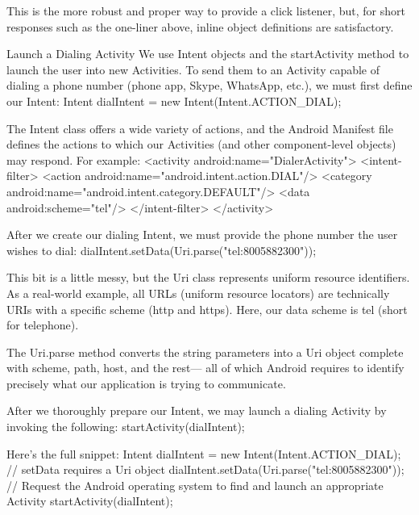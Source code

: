         This is the more robust and proper way to provide a click listener, but, for short responses such as the one-liner above, inline object definitions are satisfactory.

    Launch a Dialing Activity
        We use Intent objects and the startActivity method to launch the user into new Activities. To send them to an Activity capable of dialing a phone number (phone app, Skype, WhatsApp, etc.), we must first define our Intent:
            Intent dialIntent = new Intent(Intent.ACTION_DIAL);

        The Intent class offers a wide variety of actions, and the Android Manifest file defines the actions to which our Activities (and other component-level objects) may respond. For example:
            <activity android:name="DialerActivity">
                <intent-filter>
                    <action android:name="android.intent.action.DIAL"/>
                    <category android:name="android.intent.category.DEFAULT"/>
                    <data android:scheme="tel"/>
                </intent-filter>
            </activity>

        After we create our dialing Intent, we must provide the phone number the user wishes to dial:
            dialIntent.setData(Uri.parse("tel:8005882300"));

        This bit is a little messy, but the Uri class represents uniform resource identifiers. As a real-world example, all URLs (uniform resource locators) are technically URIs with a specific scheme (http and https). Here, our data scheme is tel (short for telephone).

        The Uri.parse method converts the string parameters into a Uri object complete with scheme, path, host, and the rest— all of which Android requires to identify precisely what our application is trying to communicate.

        After we thoroughly prepare our Intent, we may launch a dialing Activity by invoking the following:
            startActivity(dialIntent);
            
        Here’s the full snippet:
            Intent dialIntent = new Intent(Intent.ACTION_DIAL);
            // setData requires a Uri object
            dialIntent.setData(Uri.parse("tel:8005882300"));
            // Request the Android operating system to find and launch an appropriate Activity
            startActivity(dialIntent);

